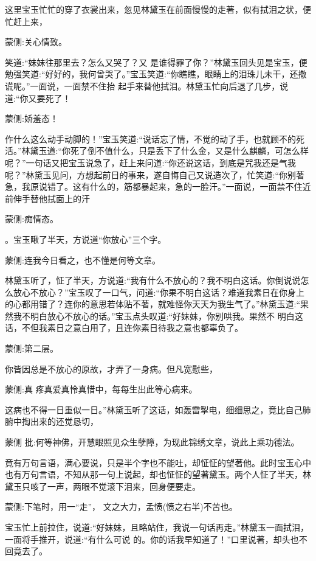 \begin{parag}
    这里宝玉忙忙的穿了衣裳出来，忽见林黛玉在前面慢慢的走著，似有拭泪之状，便忙赶上来，\begin{note}蒙侧:关心情致。\end{note}笑道:“妹妹往那里去？怎么又哭了？又 是谁得罪了你？”林黛玉回头见是宝玉，便勉强笑道:“好好的，我何曾哭了。”宝玉笑道:“你瞧瞧，眼睛上的泪珠儿未干，还撒谎呢。”一面说，一面禁不住抬 起手来替他拭泪。林黛玉忙向后退了几步，说道:“你又要死了！\begin{note}蒙侧:娇羞态！\end{note}作什么这么动手动脚的！”宝玉笑道:“说话忘了情，不觉的动了手，也就顾不的死活。”林黛玉道:“你死了倒不值什么，只是丢下了什么金，又是什么麒麟，可怎么样呢？”一句话又把宝玉说急了，赶上来问道:“你还说这话，到底是咒我还是气我呢？”林黛玉见问，方想起前日的事来，遂自悔自己又说造次了，忙笑道:“你别著急，我原说错了。这有什么的，筋都暴起来，急的一脸汗。”一面说，一面禁不住近前伸手替他拭面上的汗\begin{note}蒙侧:痴情态。\end{note}。宝玉瞅了半天，方说道“你放心”三个字。\begin{note}蒙侧:连我今日看之，也不懂是何等文章。\end{note}林黛玉听了，怔了半天，方说道:“我有什么不放心的？我不明白这话。你倒说说怎么放心不放心？”宝玉叹了一口气，问道:“你果不明白这话？难道我素日在你身上的心都用错了？连你的意思若体贴不著，就难怪你天天为我生气了。”林黛玉道:“果然我不明白放心不放心的话。”宝玉点头叹道:“好妹妹，你别哄我。果然不 明白这话，不但我素日之意白用了，且连你素日待我之意也都辜负了。\begin{note}蒙侧:第二层。\end{note}你皆因总是不放心的原故，才弄了一身病。但凡宽慰些，\begin{note}蒙侧:真 疼真爱真怜真惜中，每每生出此等心病来。\end{note}这病也不得一日重似一日。”林黛玉听了这话，如轰雷掣电，细细思之，竟比自己肺腑中掏出来的还觉恳切，\begin{note}蒙侧 批:何等神佛，开慧眼照见众生孽障，为现此锦绣文章，说此上乘功德法。\end{note}竟有万句言语，满心要说，只是半个字也不能吐，却怔怔的望著他。此时宝玉心中也有万句言语，不知从那一句上说起，却也怔怔的望著黛玉。两个人怔了半天，林黛玉只咳了一声，两眼不觉滚下泪来，回身便要走。\begin{note}蒙侧:下笔时，用一“走”， 文之大力，孟愤(愤之右半)不苦也。\end{note}宝玉忙上前拉住，说道:“好妹妹，且略站住，我说一句话再走。”林黛玉一面拭泪，一面将手推开，说道:“有什么可说 的。你的话我早知道了！”口里说著，却头也不回竟去了。
\end{parag}


